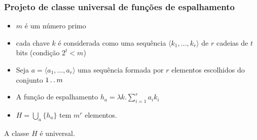 \documentclass{beamer}
\begin{document}
\begin{frame}

\frametitle{Projeto de classe universal de funções de espalhamento}

\begin{itemize}

\item $m$ é um número primo

\item cada chave $k$ é considerada como uma sequência $\langle k_1, \ldots, k_r
  \rangle$ de $r$ cadeias de $t$ bits (condição $2^t < m$)

\item Seja $a = \langle a_1, \ldots, a_r \rangle$ uma sequência formada por
  $r$ elementos escolhidos do conjunto $1 \mathinner{\ldotp\ldotp} m$

\item A função de espalhamento $h_a = \lambda k . \sum_{i=1}^{r} a_i k_i$ 

\item $H = \bigcup_a \{ h_{a} \}$ tem $m^r$ elementos.
\end{itemize}

\begin{theorem}

A classe $H$ é universal.

\end{theorem}

\end{frame}
\end{document}
